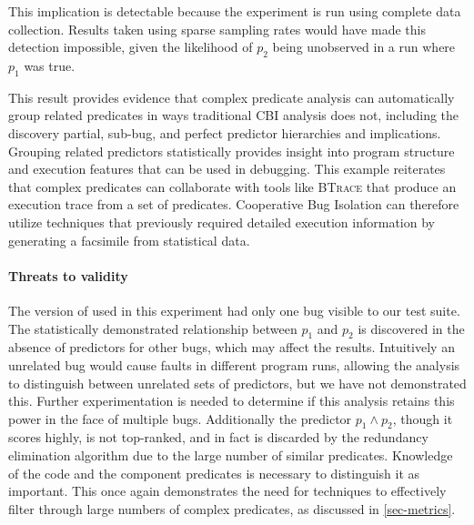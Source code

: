 This implication is detectable because the experiment is run using complete data collection.  Results taken using sparse sampling rates would have made this detection impossible, given the likelihood of $p_2$ being unobserved in a run where $p_1$ was true.

This result provides evidence that complex predicate analysis can automatically group related predicates in ways traditional CBI analysis does not, including the discovery partial, sub-bug, and perfect predictor hierarchies and implications.  Grouping related predictors statistically provides insight into program structure and execution features that can be used in debugging.  This example reiterates that complex predicates can collaborate with tools like \textsc{BTrace} that produce an execution trace from a set of predicates.  Cooperative Bug Isolation can therefore utilize techniques that previously required detailed execution information by generating a facsimile from statistical data.

\paragraph{Threats to validity}

The version of  used in this experiment had only one bug visible to our test suite.  The statistically demonstrated relationship between $p_1$ and $p_2$ is discovered in the absence of predictors for other bugs, which may affect the results.  Intuitively an unrelated bug would cause faults in different program runs, allowing the analysis to distinguish between unrelated sets of predictors, but we have not demonstrated this.  Further experimentation is needed to determine if this analysis retains this power in the face of multiple bugs.  Additionally the predictor $p_1 \wedge p_2$, though it scores highly, is not top-ranked, and in fact is discarded by the redundancy elimination algorithm due to the large number of similar predicates.  Knowledge of the code and the component predicates is necessary to distinguish it as important.  This once again demonstrates the need for techniques to effectively filter through large numbers of complex predicates, as discussed in \autoref{sec-metrics}.

